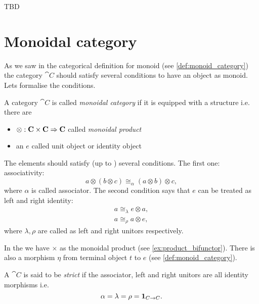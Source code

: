 TBD  

\section{Monoidal category}
As we saw in the categorical definition for monoid (see
\cref{def:monoid_category}) the category $\cat{C}$ should satisfy
several conditions to have an object as monoid. Lets formalise the conditions.
\begin{definition}
\label{def:monoidal_category}
A category $\cat{C}$ is called \textit{monoidal category} if it is
equipped with a  structure i.e. there are
\begin{itemize}
\item {} $\otimes: \mathbf{C} \times \mathbf{C} \Rightarrow
  \mathbf{C}$ called \textit{monoidal product}  
\item an  $e$ called unit object or identity object
\end{itemize}

The elements should satisfy (up to )
several conditions. The first one:
associativity: 
\begin{equation}
a \otimes \left( b \otimes c \right) \cong_\alpha
  \left( a \otimes b \right) \otimes c,
\nonumber
\end{equation}
where $\alpha$ is called associator. 
The second condition says that
$e$ can be treated as left and right identity: 
\begin{eqnarray}
a \cong_\lambda e \otimes a, 
\nonumber \\
a \cong_\rho a \otimes e,
\nonumber
\end{eqnarray}
where $\lambda, \rho$ are called as left and right unitors respectively.  
\end{definition}

In the  we have $\times$ as the monoidal
product (see \cref{ex:product_bifunctor}). There is also a
morphism $\eta$ from terminal object $t$ to $e$
\cite{bib:stackexchange:terminalinmonoid} (see \cref{def:monoid_category}). 

\begin{definition}
\label{def:strict_monoidal_category}
A  $\cat{C}$ is said to be \textit{strict} if the
associator, left and right unitors are all identity morphisms i.e.
\[
\alpha = \lambda = \rho = \mathbf{1}_{ C \to C }.
\]
 
\end{definition}


